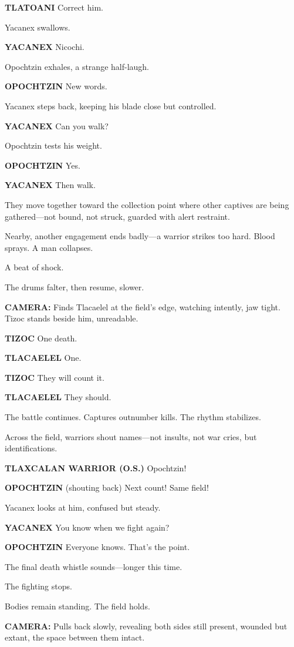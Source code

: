 \documentclass[12pt]{article}
\begin{document}
\textbf{TLATOANI}  
Correct him.

Yacanex swallows.

\textbf{YACANEX}  
Nicochi.

Opochtzin exhales, a strange half-laugh.

\textbf{OPOCHTZIN}  
New words.

Yacanex steps back, keeping his blade close but controlled.

\textbf{YACANEX}  
Can you walk?

Opochtzin tests his weight.

\textbf{OPOCHTZIN}  
Yes.

\textbf{YACANEX}  
Then walk.

They move together toward the collection point where other captives are being gathered—not bound, not struck, guarded with alert restraint.

Nearby, another engagement ends badly—a warrior strikes too hard. Blood sprays. A man collapses.

A beat of shock.

The drums falter, then resume, slower.

\textbf{CAMERA:} Finds Tlacaelel at the field’s edge, watching intently, jaw tight. Tizoc stands beside him, unreadable.

\textbf{TIZOC}  
One death.

\textbf{TLACAELEL}  
One.

\textbf{TIZOC}  
They will count it.

\textbf{TLACAELEL}  
They should.

The battle continues. Captures outnumber kills. The rhythm stabilizes.

Across the field, warriors shout names—not insults, not war cries, but identifications.

\textbf{TLAXCALAN WARRIOR (O.S.)}  
Opochtzin!

\textbf{OPOCHTZIN}  
(shouting back)  
Next count! Same field!

Yacanex looks at him, confused but steady.

\textbf{YACANEX}  
You know when we fight again?

\textbf{OPOCHTZIN}  
Everyone knows.  
That’s the point.

The final death whistle sounds—longer this time.

The fighting stops.

Bodies remain standing. The field holds.

\textbf{CAMERA:} Pulls back slowly, revealing both sides still present, wounded but extant, the space between them intact.
\end{document}
